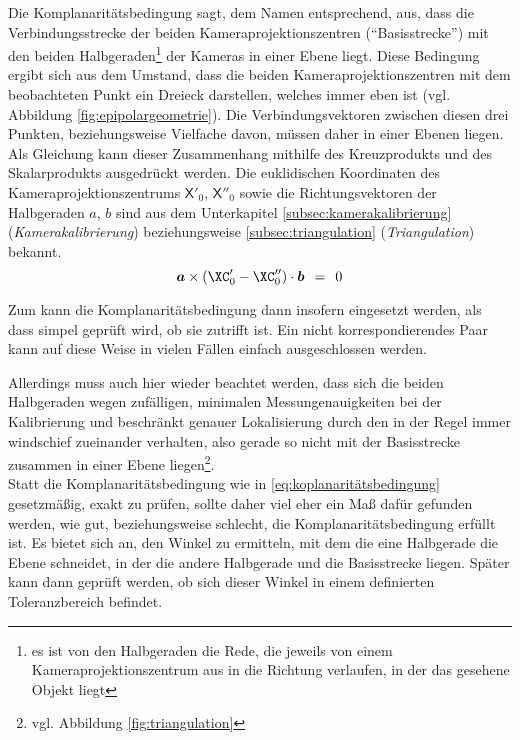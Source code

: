 Die Komplanaritätsbedingung sagt, dem Namen entsprechend, aus, dass die Verbindungsstrecke der beiden Kameraprojektionszentren (``Basisstrecke'') mit den beiden Halbgeraden\footnote{es ist von den Halbgeraden die Rede, die jeweils von einem Kameraprojektionszentrum aus in die Richtung verlaufen, in der das gesehene Objekt liegt} der Kameras in einer Ebene liegt. Diese Bedingung ergibt sich aus dem Umstand, dass die beiden Kameraprojektionszentren mit dem beobachteten Punkt ein Dreieck darstellen, welches immer eben ist (vgl. Abbildung \ref{fig:epipolargeometrie}). Die Verbindungsvektoren zwischen diesen drei Punkten, beziehungsweise Vielfache davon, müssen daher in einer Ebenen liegen.\\
Als Gleichung kann dieser Zusammenhang mithilfe des Kreuzprodukts und des Skalarprodukts ausgedrückt werden. Die euklidischen Koordinaten des Kameraprojektionszentrums $\mathsf{X}'_0$, $\mathsf{X}''_0$ sowie die Richtungsvektoren der Halbgeraden $a$, $b$ sind aus dem Unterkapitel \ref{subsec:kamerakalibrierung} (\emph{Kamerakalibrierung}) beziehungsweise \ref{subsec:triangulation} (\emph{Triangulation}) bekannt.
\begin{equation}\label{eq:koplanaritätsbedingung}
	\boldsymbol{a} \times (\XC'_0-\XC''_0) \cdot\boldsymbol{b}  \:\:=\:\: 0
\end{equation}\kleinerabstand

Zum  kann die Komplanaritätsbedingung dann insofern eingesetzt werden, als dass simpel geprüft wird, ob sie zutrifft ist. Ein nicht korrespondierendes Paar kann auf diese Weise in vielen Fällen einfach ausgeschlossen werden.\kleinerabstand

\noindent Allerdings muss auch hier wieder beachtet werden, dass sich die beiden Halbgeraden wegen zufälligen, minimalen Messungenauigkeiten bei der Kalibrierung und beschränkt genauer Lokalisierung durch den  in der Regel immer windschief zueinander verhalten, also gerade so nicht mit der Basisstrecke zusammen in einer Ebene liegen\footnote{vgl. Abbildung \ref{fig:triangulation}}.\\
Statt die Komplanaritätsbedingung wie in \eqref{eq:koplanaritätsbedingung} gesetzmäßig, exakt zu prüfen, sollte daher viel eher ein Maß dafür gefunden werden, wie gut, beziehungsweise schlecht, die Komplanaritätsbedingung erfüllt ist.
Es bietet sich an, den Winkel zu ermitteln, mit dem die eine Halbgerade die Ebene schneidet, in der die andere Halbgerade und die Basisstrecke liegen. Später kann dann geprüft werden, ob sich dieser Winkel in einem definierten Toleranzbereich befindet.\kleinerabstand

